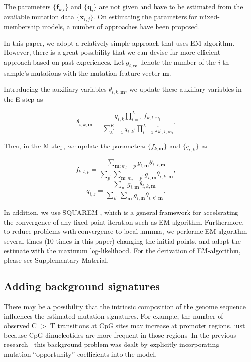 The parameters $\{ \bm{f}_{k, l} \}$ and $\{ \bm{q}_i \}$
are not given and have to be estimated from the available mutation data $\{ \bm{x}_{i,j} \}$.
On estimating the parameters for mixed-membership models, a number of approaches have been proposed.


In this paper, we adopt a relatively simple approach that uses EM-algorithm.
However, there is a great possibility that we can devise far more efficient approach based on past experiences.
Let $g_{i, \bm{m}}$ denote the number of the $i$-th sample's mutations with the mutation feature vector $\bm{m}$.

Introducing the auxiliary variables $\theta_{i, k, \bm{m}}$, 
we update these auxiliary variables in the E-step as

\begin{equation*}
\theta_{i, k, \bm{m}} = \frac{  q_{i,k} \prod_{l=1}^L f_{k,l,m_l} }{ \sum_{k^{\prime} = 1}^K q_{i, k^{\prime} } \prod_{l=1}^L f_{k^{\prime}, l, m_l } }.
\end{equation*}

Then, in the M-step, we update the parameters $\{ f_{k, \bm{m} } \}$ and $\{ q_{i, k} \}$ as

\begin{equation*}
f_{k, l, p} = \frac{ \sum_{\bm{m} : m_l = p} g_{i, \bm{m}} \theta_{i, k, \bm{m}} }{ \sum_{p^{\prime} } 
\sum_{\bm{m} : m_l = p^{\prime}}  g_{i, \bm{m}}\theta_{i, k, \bm{m}} },
\end{equation*}
\begin{equation*}
q_{i, k} = \frac{ \sum_{\bm{m}} g_{i, \bm{m}} \theta_{i, k, \bm{m} } }{  \sum_{k^{\prime} }\sum_{\bm{m}} g_{i, \bm{m}} \theta_{i, k^{\prime}, \bm{m} } }.
\end{equation*}

In addition, we use SQUAREM \cite{varadhan2008simple},
which is a general framework for accelerating the convergence of any fixed-point iteration such as EM algorithm. 
Furthermore, to reduce problems with convergence to local minima, 
we performe EM-algorithm several times (10 times in this paper) changing the initial points,
and adopt the estimate with the maximum log-likelihood.
For the derivation of EM-algorithm, please see Supplementary Material.


\subsection*{Adding background signatures}

There may be a possibility that the intrinsic composition of the genome sequence influences the estimated mutation signatures.
For example, the number of observed C $>$ T transitions at CpG sites may increase at promoter regions,
just because CpG dinucleotides are more frequent in those regions.
In the previous research \cite{pmid23628380}, this background problem was dealt 
by explicitly incorporating mutation ``opportunity'' coefficients into the model.


